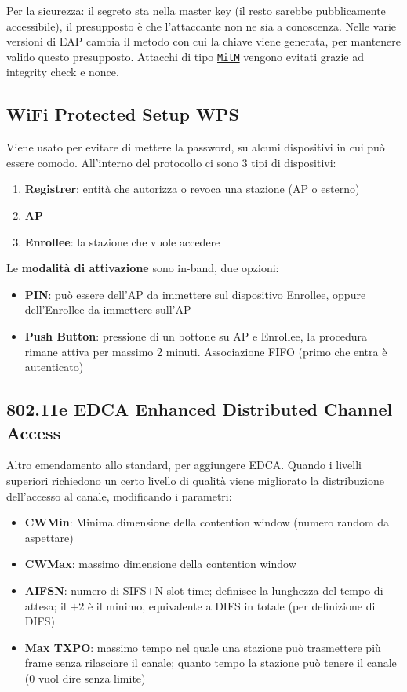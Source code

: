 Per la sicurezza: il segreto sta nella master key (il resto sarebbe pubblicamente accessibile), il presupposto è che l'attaccante non ne sia a conoscenza. Nelle varie versioni di EAP cambia il metodo con cui la chiave viene generata, per mantenere valido questo presupposto. Attacchi di tipo \href{https://it.wikipedia.org/wiki/Attacco_man_in_the_middle}{\texttt{MitM}} vengono evitati grazie ad integrity check e nonce.\\

\subsection{WiFi Protected Setup WPS}
Viene usato per evitare di mettere la password, su alcuni dispositivi in cui può essere comodo. All'interno del protocollo ci sono 3 tipi di dispositivi: 
\begin{enumerate}
	\item \textbf{Registrer}: entità che autorizza o revoca una stazione (AP o esterno)
	\item \textbf{AP}
	\item \textbf{Enrollee}: la stazione che vuole accedere
\end{enumerate}

Le \textbf{modalità di attivazione} sono in-band, due opzioni: 
\begin{itemize}
	\item \textbf{PIN}: può essere dell'AP da immettere sul dispositivo Enrollee, oppure dell'Enrollee da immettere sull'AP
	\item \textbf{Push Button}: pressione di un bottone su AP e Enrollee, la procedura rimane attiva per massimo 2 minuti. Associazione FIFO (primo che entra è autenticato)
\end{itemize}

\newpage

\subsection{802.11e EDCA Enhanced Distributed Channel Access}

Altro emendamento allo standard, per aggiungere EDCA. Quando i livelli superiori richiedono un certo livello di qualità viene migliorato la distribuzione dell'accesso al canale, modificando i parametri: 
\begin{itemize}
	\item \textbf{CWMin}: Minima dimensione della contention window (numero random da aspettare)
	\item \textbf{CWMax}: massimo dimensione della contention window
	\item \textbf{AIFSN}: numero di SIFS+N slot time; definisce la lunghezza del tempo di attesa; il $+2$ è il minimo, equivalente a DIFS in totale (per definizione di DIFS)
	\item \textbf{Max TXPO}: massimo tempo nel quale una stazione può trasmettere più frame senza rilasciare il canale; quanto tempo la stazione può tenere il canale (0 vuol dire senza limite)
\end{itemize}

